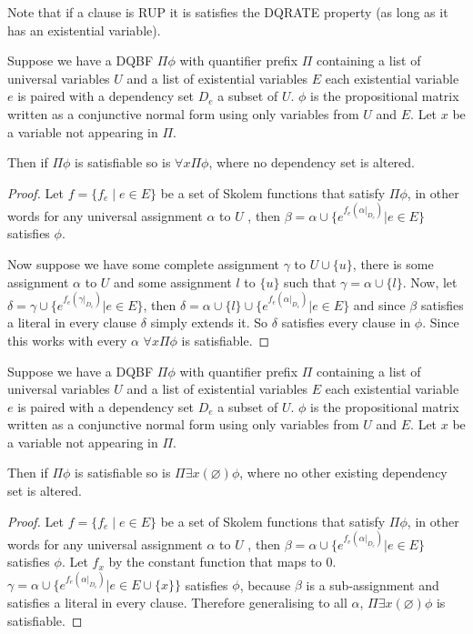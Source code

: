 \documentclass[runningheads]{llncs}
\begin{document}
	Note that if a clause is RUP it is satisfies the DQRATE property (as long as it has an existential variable).
	
	\begin{lemma}
		Suppose we have a DQBF $\Pi \phi$ with quantifier prefix $\Pi$ containing a list of universal variables $U$ and a list of existential variables $E$ each existential variable $e$ is paired with a dependency set $D_e$ a subset of $U$. $\phi$ is the propositional matrix written as a conjunctive normal form using only variables from $U$ and $E$.
		Let $x$ be a variable not appearing in $\Pi$.
		
		Then if $\Pi \phi$ is satisfiable so is $\forall x \Pi \phi$, where no dependency set is altered.
	\end{lemma}
	\begin{proof}
		Let $f=\{f_e \mid e\in E \}$ be a set of Skolem functions that satisfy $\Pi \phi$, in other words for any universal assignment $\alpha$ to $U$ , then $\beta= \alpha\cup \{e^{f_e(\alpha |_{D_e})} | e\in E\}$ satisfies $\phi$.
		
		Now suppose we have some complete assignment $\gamma$ to $U\cup\{u\}$, there is some assignment $\alpha$ to $U$ and some assignment $l$ to $\{u\}$ such that   $\gamma=\alpha\cup\{l \}$. Now, let $\delta = \gamma\cup \{e^{f_e(\gamma |_{D_e})} | e\in E\}$, then $\delta = \alpha\cup\{l\} \cup \{e^{f_e(\alpha |_{D_e})} | e\in E\}$ and since $\beta$ satisfies a literal in every clause $\delta$ simply extends it. So $\delta$ satisfies every clause in $\phi$. Since this works with every $\alpha$ $\forall x \Pi \phi$ is satisfiable.
	\end{proof}
	\begin{lemma}
		Suppose we have a DQBF $\Pi \phi$ with quantifier prefix $\Pi$ containing a list of universal variables $U$ and a list of existential variables $E$ each existential variable $e$ is paired with a dependency set $D_e$ a subset of $U$. $\phi$ is the propositional matrix written as a conjunctive normal form using only variables from $U$ and $E$.
		Let $x$ be a variable not appearing in $\Pi$.
		
		Then if $\Pi \phi$ is satisfiable so is $\Pi \exists x(\varnothing) \phi$, where no other existing dependency set is altered.
	\end{lemma}
	\begin{proof}
	Let $f=\{f_e \mid e\in E \}$ be a set of Skolem functions that satisfy $\Pi \phi$, in other words for any universal assignment $\alpha$ to $U$ , then $\beta= \alpha\cup \{e^{f_e(\alpha |_{D_e})} | e\in E\}$ satisfies $\phi$.
	Let $f_x$ by the constant function that maps to $0$. $\gamma= \alpha\cup \{e^{f_e(\alpha |_{D_e})} | e\in E\cup\{x\}\}$ satisfies $\phi$, because $\beta$ is a sub-assignment and satisfies a literal in every clause. Therefore generalising to all $\alpha$, $\Pi \exists x(\varnothing) \phi$ is satisfiable.
	\end{proof}
	
\end{document}
